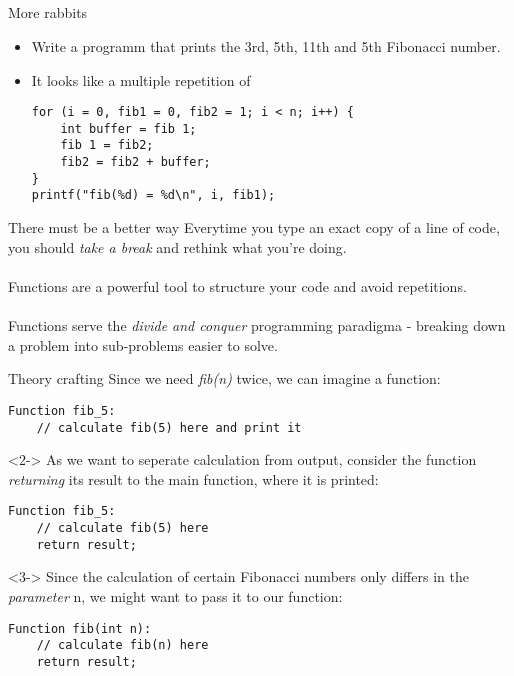 \subsection{}
\begin{frame}[fragile]{More rabbits}
	\begin{itemize}
		\item Write a programm that prints the 3rd, 5th, 11th and 5th Fibonacci number.
		\item<2-> It looks like a multiple repetition of
		\begin{lstlisting}
for (i = 0, fib1 = 0, fib2 = 1; i < n; i++) {
	int buffer = fib 1;
	fib 1 = fib2;
	fib2 = fib2 + buffer;
}
printf("fib(%d) = %d\n", i, fib1);
\end{lstlisting}
	\end{itemize}
\end{frame}
\begin{frame}{There must be a better way}
	Everytime you type an exact copy of a line of code, you should \textit{take a break} and rethink what you're doing. \\ \ \\
	Functions are a powerful tool to structure your code and avoid repetitions. \\ \ \\
	Functions serve the \textit{divide and conquer} programming paradigma - breaking down a problem into sub-problems easier to solve.
\end{frame}
\begin{frame}[fragile]{Theory crafting}
	Since we need \textit{fib(n)} twice, we can imagine a function:
	\begin{lstlisting}[numbers=none]
Function fib_5:
	// calculate fib(5) here and print it
\end{lstlisting}
	\begin{uncoverenv}<2->
	As we want to seperate calculation from output, consider the function \textit{returning} its result to the main function, where it is printed:
	\begin{lstlisting}[numbers=none]
Function fib_5:
	// calculate fib(5) here
	return result;
\end{lstlisting}
	\end{uncoverenv}
	\begin{uncoverenv}<3->
	Since the calculation of certain Fibonacci numbers only differs in the \textit{parameter} n, we might want to pass it to our function:
	\begin{lstlisting}[numbers=none]
Function fib(int n):
	// calculate fib(n) here
	return result;
\end{lstlisting}
	\end{uncoverenv}
\end{frame}
